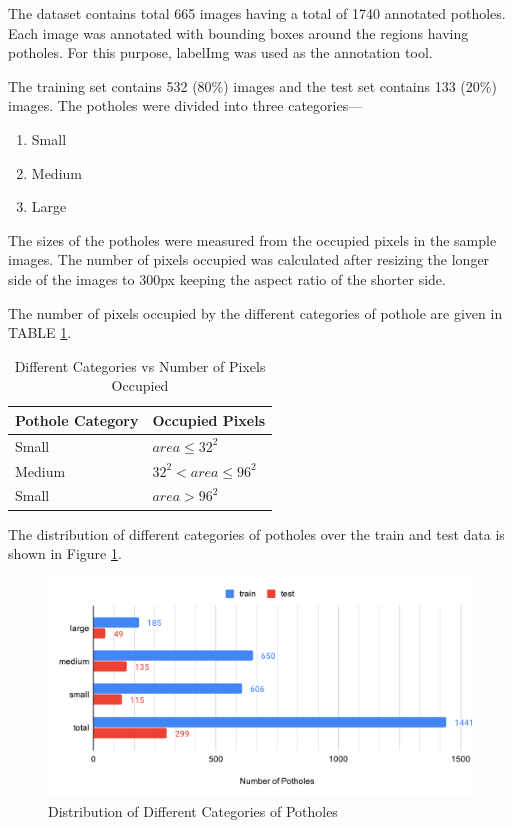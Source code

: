 \documentclass[conference]{IEEEtran}
\begin{document}
The dataset contains total 665 images having a total of 1740 annotated potholes. Each image was annotated with bounding boxes around the regions having potholes. For this purpose, labelImg\cite{tzutalingit} was used as the annotation tool.
   
The training set contains 532 (80\%) images and the test set contains 133 (20\%) images. The potholes were divided into three categories---
\begin{enumerate}
  \item Small
  \item Medium
  \item Large
\end{enumerate}
   
The sizes of the potholes were measured from the occupied pixels in the sample images. 
The number of pixels occupied was calculated after resizing the longer side of the images to 300px keeping the aspect ratio of the shorter side.
   
The number of pixels occupied by the different categories of pothole are given in TABLE \ref{tab:size_categories}.
   
\begin{table}[h]
  \centering
  \caption{Different Categories vs Number of Pixels Occupied}
  \label{tab:size_categories}
  \renewcommand{\arraystretch}{1.3}
  \begin{tabular}{l||l}
    \bfseries{Pothole Category} & \bfseries{Occupied Pixels} \\  \hline\hline
    Small                       & $area \leq 32^2$           \\ \hline
    Medium                      & $32^2 < area \leq 96^2$    \\ \hline
    Small                       & $area > 96^2$              \\ \hline
  \end{tabular}
\end{table}
The distribution of different categories of potholes over the train and test data is shown in Figure \ref{fig:size_distribution}.
    
\begin{figure}[h]
  \centering
  \includegraphics[width=.95\columnwidth]{img/potholes-in-dataset}
  \caption{Distribution of Different Categories of Potholes}
  \label{fig:size_distribution}
\end{figure}
\end{document}
